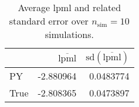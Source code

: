 \begin{table}[H]

\caption{Average lpml and related standard error over $n_{\text{sim}} = 10$ simulations.}
\centering
\begin{tabular}[t]{lrr}
\toprule
  & $\overbar{\text{lpml}}$ & $\text{sd}(\overbar{\text{lpml}})$\\
\midrule
PY & -2.880964 & 0.0483774\\
True & -2.808365 & 0.0473897\\
\bottomrule
\end{tabular}
\end{table}